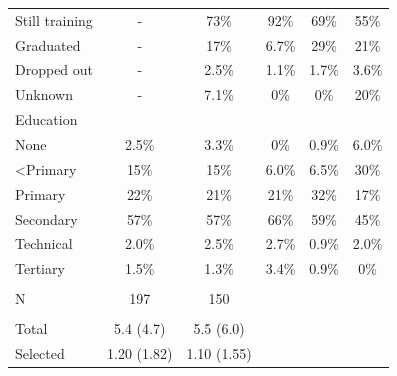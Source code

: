 \documentclass[
  11pt,
a4paper
]{article}
\begin{document}
\begin{table}[H]
\begin{threeparttable}
{\begin{tabular}[t]{lccccc}
\hspace{1em}\hspace{1em}Still training & - & 73\% & 92\% & 69\% & 55\%\\
\hspace{1em}\hspace{1em}Graduated & - & 17\% & 6.7\% & 29\% & 21\%\\
\hspace{1em}\hspace{1em}Dropped out & - & 2.5\% & 1.1\% & 1.7\% & 3.6\%\\
\hspace{1em}\hspace{1em}Unknown & - & 7.1\% & 0\% & 0\% & 20\%\\
\hspace{1em}Education &  &  &  &  & \\
\hspace{1em}\hspace{1em}None & 2.5\% & 3.3\% & 0\% & 0.9\% & 6.0\%\\
\hspace{1em}\hspace{1em}<Primary & 15\% & 15\% & 6.0\% & 6.5\% & 30\%\\
\hspace{1em}\hspace{1em}Primary & 22\% & 21\% & 21\% & 32\% & 17\%\\
\hspace{1em}\hspace{1em}Secondary & 57\% & 57\% & 66\% & 59\% & 45\%\\
\hspace{1em}\hspace{1em}Technical & 2.0\% & 2.5\% & 2.7\% & 0.9\% & 2.0\%\\
\hspace{1em}\hspace{1em}Tertiary & 1.5\% & 1.3\% & 3.4\% & 0.9\% & 0\%\\
\addlinespace[0.3em]
\hline
\multicolumn{6}{l}{\textbf{Firms}}\\
\hspace{1em}N & 197 & 150 &  &  & \\
\addlinespace[0.3em]
\multicolumn{6}{l}{\hspace{1em}Apprentices trained}\\
\hspace{1em}\hspace{1em}Total & 5.4 (4.7) & 5.5 (6.0) &  &  & \\
\hspace{1em}\hspace{1em}Selected & 1.20 (1.82) & 1.10 (1.55) &  &  & \\

\end{tabular}}
\end{threeparttable}
\end{table}
\end{document}
